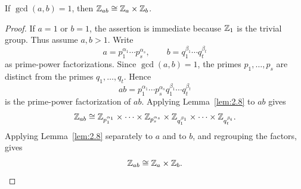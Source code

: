 \documentclass[../Odyssey_Project.tex]{subfiles}
\begin{document}
\begin{corollary}
\label{cor:2.9}
If $\gcd(a,b) = 1$, then $\mathbb{Z}_{ab} \cong \mathbb{Z}_a \times \mathbb{Z}_b$.
\end{corollary}
\begin{proof}
    If $a = 1$ or $b = 1$, the assertion is immediate because $\mathbb{Z}_1$ is the trivial group. Thus assume $a,b > 1$. Write
    \[
        a = p_1^{\alpha_1}\cdots p_s^{\alpha_s},
        \qquad
        b = q_1^{\beta_1}\cdots q_t^{\beta_t}
    \]
    as prime-power factorizations. Since $\gcd(a,b) = 1$, the primes $p_1,\dots,p_s$ are distinct from the primes $q_1,\dots,q_t$. Hence
    \[
        ab = p_1^{\alpha_1}\cdots p_s^{\alpha_s}q_1^{\beta_1}\cdots q_t^{\beta_t}
    \]
    is the prime-power factorization of $ab$. Applying Lemma~\ref{lem:2.8} to $ab$ gives
    \[
        \mathbb{Z}_{ab}
        \cong \mathbb{Z}_{p_1^{\alpha_1}} \times \cdots \times \mathbb{Z}_{p_s^{\alpha_s}} \times \mathbb{Z}_{q_1^{\beta_1}} \times \cdots \times \mathbb{Z}_{q_t^{\beta_t}}.
    \]
    Applying Lemma~\ref{lem:2.8} separately to $a$ and to $b$, and regrouping the factors, gives
    \[
        \mathbb{Z}_{ab} \cong \mathbb{Z}_a \times \mathbb{Z}_b.
    \]
\end{proof}
\end{document}
